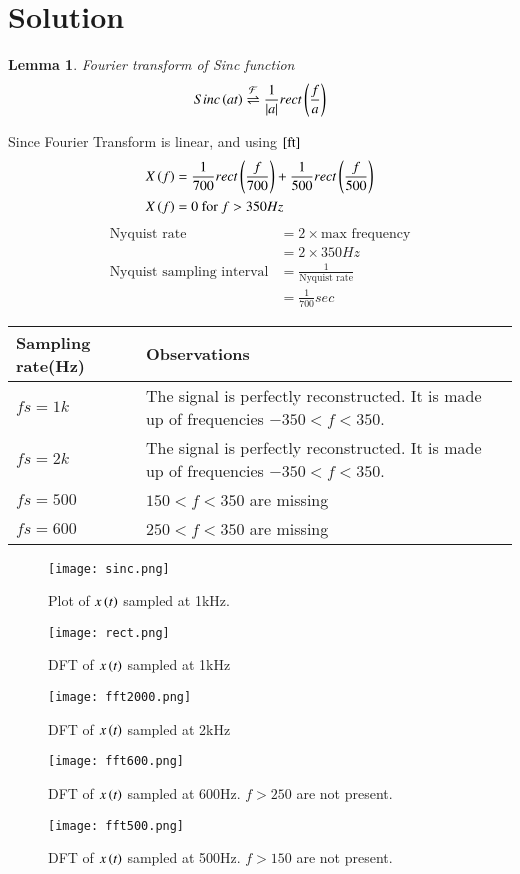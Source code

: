 \documentclass[journal,12pt,twocolumn]{IEEEtran}
\newtheorem{lemma}[theorem]{Lemma}
\begin{document}
\section{Solution}
\begin{lemma}{Fourier transform of Sinc function}
\begin{align}
    Sinc\left(at\right) \overset{\mathcal{F}}{ \rightleftharpoons} \frac{1}{|a|}rect\left(\frac{f}{a}\right)\label{ft}
\end{align}
\end{lemma}
Since Fourier Transform is linear, and using $\eqref{ft}$
\begin{align}
    X\left(f\right)&=\frac{1}{700}rect\left(\frac{f}{700}\right)+\frac{1}{500}rect\left(\frac{f}{500}\right)\\
    X\left(f\right)&=0  \text{   for } f>350Hz
\end{align}
\begin{align}
    \text{Nyquist rate} &= 2 \times \text{max frequency}\\
    &= 2\times 350 Hz\\
    \text{Nyquist sampling interval} &= \frac{1}{\text{Nyquist rate}}\\
    &= \frac{1}{700}sec
\end{align}
\begin{center}
\begin{tabular}{ |m{2cm}|m{4.5cm}| } 
 \hline
 Sampling rate(Hz) & Observations \\
 \hline
 $fs=1k$& The signal is perfectly reconstructed. It is made up of frequencies $-350<f<350$. \\
 \hline
 $fs=2k$ & The signal is perfectly reconstructed. It is made up of frequencies $-350<f<350$. \\
 \hline
 $fs=500$ & $150<f<350$ are missing   \\ 
 \hline
 $fs=600$ & $250<f<350$ are missing  \\ 
 \hline
\end{tabular}
\end{center}
\begin{figure}[!h]
 \centering
 \texttt{[image: sinc.png]}
 \caption{Plot of $x\left(t\right)$ sampled at 1kHz.} 
\end{figure}
\begin{figure}[!h]
 \centering
 \texttt{[image: rect.png]}
 \caption{DFT of $x\left(t\right)$ sampled at 1kHz} 
\end{figure}
\begin{figure}[!h]
 \centering
 \texttt{[image: fft2000.png]}
 \caption{DFT of $x\left(t\right)$ sampled at 2kHz} 
\end{figure}
\begin{figure}[!h]
 \centering
 \texttt{[image: fft600.png]}
 \caption{DFT of $x\left(t\right)$ sampled at 600Hz. $f>250$ are not present.} 
\end{figure}
\begin{figure}[!h]
 \centering
 \texttt{[image: fft500.png]}
 \caption{DFT of $x\left(t\right)$ sampled at 500Hz. $f>150$ are not present.} 
\end{figure}
\end{document}
